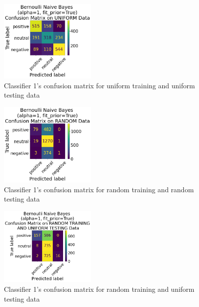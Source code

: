 \documentclass[11pt]{article}
\begin{document}
\begin{figure}[!h]
	\centering
	\includegraphics[width = 0.42\textwidth]{cf/BernoulliNaiveBayesalpha1fit_priorTrue-Uniform-confusion-matrix.png}
	\caption{Classifier 1's confusion matrix for uniform training and uniform testing data}
	\label{fig:cf-1st-uu}
\end{figure} 

\begin{figure}[!h]
	\centering
	\includegraphics[width = 0.42\textwidth]{cf/BernoulliNaiveBayesalpha1fit_priorTrue-Random-confusion-matrix.png}
	\caption{Classifier 1's confusion matrix for random training and random testing data}
	\label{fig:cf-1st-rr}
\end{figure} 

\begin{figure}[!h]
	\centering
	\includegraphics[width = 0.42\textwidth]{cf/BernoulliNaiveBayesalpha1fit_priorTrue-RandomTrainingandUniformTesting-confusion-matrix.png}
	\caption{Classifier 1's confusion matrix for random training and uniform testing data}
	\label{fig:cf-1st-ru}
\end{figure} 
\end{document}
